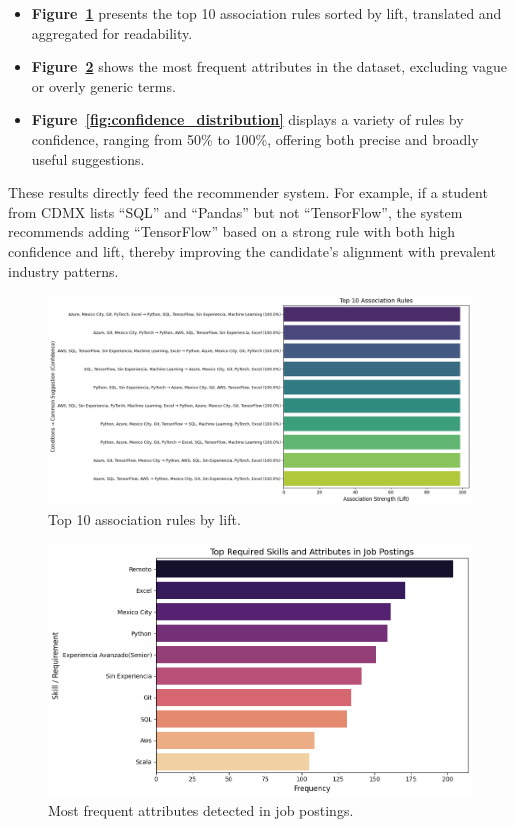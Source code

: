\documentclass[runningheads]{llncs}
\begin{document}
	\begin{itemize}
		\item \textbf{Figure~\ref{fig:top_rules}} presents the top 10 association rules sorted by lift, translated and aggregated for readability.
		\item \textbf{Figure~\ref{fig:frequent_attrs}} shows the most frequent attributes in the dataset, excluding vague or overly generic terms.
		\item \textbf{Figure~\ref{fig:confidence_distribution}} displays a variety of rules by confidence, ranging from 50\% to 100\%, offering both precise and broadly useful suggestions.
	\end{itemize}
	
	
	These results directly feed the recommender system. For example, if a student from CDMX lists ``SQL'' and ``Pandas'' but not ``TensorFlow'', the system recommends adding ``TensorFlow'' based on a strong rule with both high confidence and lift, thereby improving the candidate's alignment with prevalent industry patterns.
	
		\begin{figure}[H]
		     \centering
		     \includegraphics[width=0.9\linewidth]{imagenes/top_rules.png}
		     \caption{Top 10 association rules by lift.}
		     \label{fig:top_rules}
		 \end{figure}
	
	 \begin{figure}[H]
		     \centering
		     \includegraphics[width=0.9\linewidth]{imagenes/frequent_attributes.png}
		     \caption{Most frequent attributes detected in job postings.}
		     \label{fig:frequent_attrs}
		 \end{figure}
	
\end{document}
